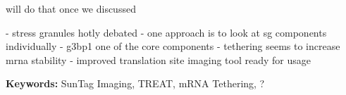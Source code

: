 will do that once we discussed

- stress granules hotly debated
- one approach is to look at sg components individually
- g3bp1 one of the core components
- tethering seems to increase mrna stability
- improved translation site imaging tool ready for usage

\noindent
\textbf{Keywords:}
SunTag Imaging, TREAT, mRNA Tethering, ?